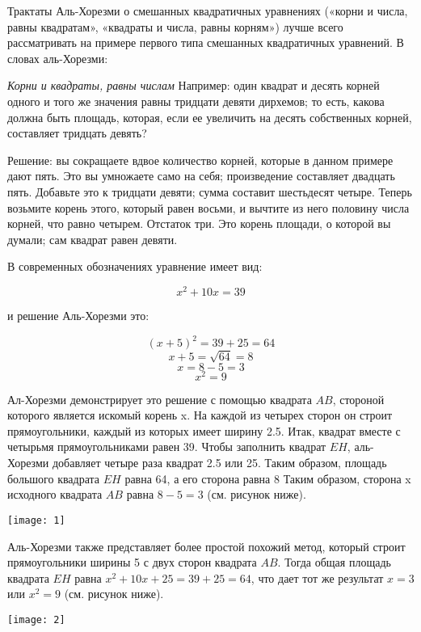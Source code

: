 Трактаты Аль-Хорезми о смешанных квадратичных уравнениях («корни и числа, равны квадратам», «квадраты и числа, равны корням») лучше всего рассматривать на примере первого типа смешанных квадратичных уравнений. В словах аль-Хорезми:


\begin{displayquote}
\textit{Корни и квадраты, равны числам}
Например: один квадрат и десять корней одного и того же значения равны тридцати девяти дирхемов; то есть, какова должна быть площадь, которая, если ее увеличить на десять собственных корней, составляет тридцать девять?

Решение: вы сокращаете вдвое количество корней, которые в данном примере дают пять. Это вы умножаете само на себя; произведение составляет двадцать пять. Добавьте это к тридцати девяти; сумма составит шестьдесят четыре. Теперь возьмите корень этого, который равен восьми, и вычтите из него половину числа корней, что равно четырем. Отстаток три. Это корень площади, о которой вы думали; сам квадрат равен девяти.
\end{displayquote}

В современных обозначениях уравнение имеет вид:

$$x^2 + 10x = 39$$

и решение Аль-Хорезми это:

$$(x + 5)^2 = 39 + 25 = 64$$
$$x + 5 = \sqrt{64} = 8$$
$$x = 8 -5 = 3$$
$$x^2 = 9$$

Ал-Хорезми демонстрирует это решение с помощью квадрата $AB$, стороной которого является искомый корень x. На каждой из четырех сторон он строит прямоугольники, каждый из которых имеет ширину 2.5. Итак, квадрат вместе с четырьмя прямоугольниками равен 39. Чтобы заполнить квадрат $EH$, аль-Хорезми добавляет четыре раза квадрат 2.5 или 25. Таким образом, площадь большого квадрата $EH$ равна 64, а его сторона равна 8 Таким образом, сторона x исходного квадрата $AB$ равна $8 - 5 = 3$ (см. рисунок ниже).

\texttt{[image: 1]}

Аль-Хорезми также представляет более простой похожий метод, который строит прямоугольники ширины 5 с двух сторон квадрата $AB$. Тогда общая площадь квадрата $EH$ равна $x^2 + 10x + 25 = 39 + 25 = 64$, что дает тот же результат $x = 3$ или $x^2 = 9$ (см. рисунок ниже).

\texttt{[image: 2]}


